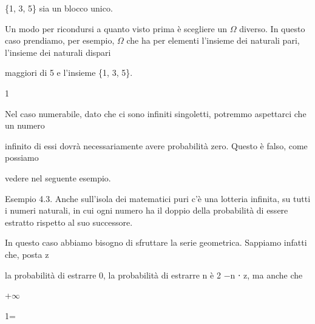 \documentclass[a4paper,portrait,12pt]{article}
\begin{document}
\begin{flushleft}
\{1, 3, 5\} sia un blocco unico.
\end{flushleft}


\begin{flushleft}
Un modo per ricondursi a quanto visto prima \`{e} scegliere un $\Omega$ diverso. In questo caso prendiamo, per esempio, $\Omega$ che ha per elementi l'insieme dei naturali pari, l'insieme dei naturali dispari
\end{flushleft}


\begin{flushleft}
maggiori di 5 e l'insieme \{1, 3, 5\}.
\end{flushleft}


1





\begin{flushleft}
Nel caso numerabile, dato che ci sono infiniti singoletti, potremmo aspettarci che un numero
\end{flushleft}


\begin{flushleft}
infinito di essi dovr\`{a} necessariamente avere probabilit\`{a} zero. Questo \`{e} falso, come possiamo
\end{flushleft}


\begin{flushleft}
vedere nel seguente esempio.
\end{flushleft}


\begin{flushleft}
Esempio 4.3. Anche sull'isola dei matematici puri c'\`{e} una lotteria infinita, su tutti i numeri naturali, in cui ogni numero ha il doppio della probabilit\`{a} di essere estratto rispetto al suo successore.
\end{flushleft}


\begin{flushleft}
In questo caso abbiamo bisogno di sfruttare la serie geometrica. Sappiamo infatti che, posta z
\end{flushleft}


\begin{flushleft}
la probabilit\`{a} di estrarre 0, la probabilit\`{a} di estrarre n \`{e} 2 $-$n ⋅ z, ma anche che
\end{flushleft}


+$\infty$





1=
\end{document}
